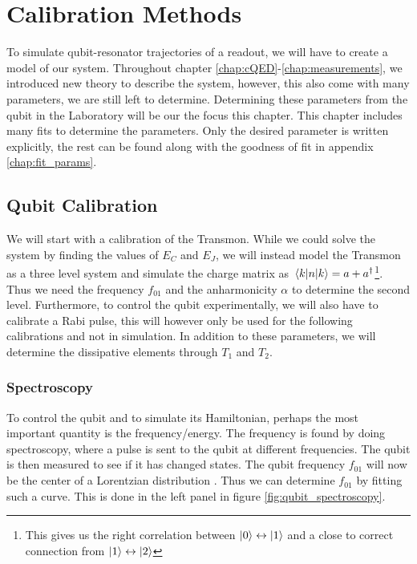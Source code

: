 \chapter{Calibration Methods}\label{chap:calibration}
To simulate qubit-resonator trajectories of a readout, we will have to create a model of our system. Throughout chapter \ref{chap:cQED}-\ref{chap:measurements}, we introduced new theory to describe the system, however, this also come with many parameters, we are still left to determine. Determining these parameters from the qubit in the Laboratory will be our the focus this chapter. This chapter includes many fits to determine the parameters. Only the desired parameter is written explicitly, the rest can be found along with the goodness of fit in appendix \ref{chap:fit_params}.




\section{Qubit Calibration}
We will start with a calibration of the Transmon. While we could solve the system by finding the values of $E_C$ and $E_J$, we will instead model the Transmon as a three level system and simulate the charge matrix as $\mel{k}{n}{k} = a + a^\dagger$\footnote{This gives us the right correlation between $\ket{0}\leftrightarrow \ket{1}$ and a close to correct connection from $\ket{1}\leftrightarrow\ket{2}$}. Thus we need the frequency $f_{01}$ and the anharmonicity $\alpha$ to determine the second level. Furthermore, to control the qubit experimentally, we will also have to calibrate a Rabi pulse, this will however only be used for the following calibrations and not in simulation. In addition to these parameters, we will determine the dissipative elements through $T_1$ and $T_2$.

\subsection{Spectroscopy}\label{sec:qubit_spectroscopy}
To control the qubit and to simulate its Hamiltonian, perhaps the most important quantity is the frequency/energy. The frequency is found by doing spectroscopy, where a pulse is sent to the qubit at different frequencies. The qubit is then measured to see if it has changed states. The qubit frequency $f_{01}$ will now be the center of a Lorentzian distribution \cite{asdfasdfasdf}. Thus we can determine $f_{01}$ by fitting such a curve. This is done in the left panel in figure \ref{fig:qubit_spectroscopy}.

